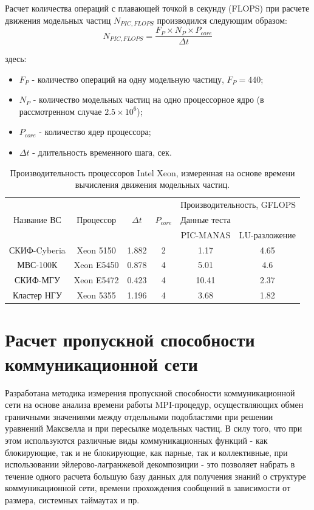 Расчет количества операций с плавающей точкой в секунду (FLOPS) при расчете движения модельных частиц $N_{PIC,FLOPS}$ производился следующим образом:
\begin{equation}
N_{PIC,FLOPS} = \frac{F_P\times N_P \times P_{core}}{\Delta t}
\label{PIC_FLOPS}
\end{equation}

здесь:
\begin{itemize}
	\item $F_P$ - количество операций на одну модельную частицу, $F_P = 440$;
	\item $N_P$ - количество модельных частиц на одно процессорное ядро (в рассмотренном случае $2.5\times 10^6$);  
	\item $P_{core}$ - количество ядер процессора;
	\item $\Delta t$  - длительность временного шага, сек.
\end{itemize}	

\begin{table}[ht]
	\caption{Производительность процессоров Intel Xeon, измеренная на основе времени вычисления движения модельных частиц.}
	\label{PIC_vs_LU}
	\begin{tabular}{|c|c|c|c|c|c|}
		\hline
		&            &            &             &       \multicolumn{2}{|c|}{Производительность, GFLOPS} \\ \cline{5-6}  	
		Название ВС  & Процессор  &  $\Delta t$ &$P_{core}$ & Данные теста  &  \\
		             &            &             &           & PIC-MANAS     & LU-разложение \\ \hline
		СКИФ-Cyberia & Xeon 5150  &  1.882      & 2     &  1.17          & 4.65    \\ \hline
		МВС-100К     & Xeon E5450 &  0.878      & 4     & 5.01           & 4.6     \\ \hline 
		СКИФ-МГУ     & Xeon E5472 &  0.423      & 4     & 10.41          & 2.37       \\ \hline     
		Кластер НГУ  & Xeon 5355  &  1.196      & 4     & 3.68           & 1.82       \\ \hline
	\end{tabular}	
\end{table}






\section{Расчет пропускной способности коммуникационной сети}
\label{perfCommNet}
Разработана методика измерения пропускной способности коммуникационной сети на основе анализа времени работы MPI-процедур, осуществляющих обмен граничными значениями между отдельными подобластями при решении уравнений Максвелла и при пересылке модельных частиц. В силу того, что при этом используются различные виды коммуникационных функций  - как блокирующие, так и не блокирующие, как парные, так и коллективные, при использовании эйлерово-лагранжевой декомпозиции - это позволяет набрать в течение одного расчета большую базу данных для получения знаний о структуре коммуникационной сети, времени прохождения сообщений в зависимости от размера, системных таймаутах и пр. 

